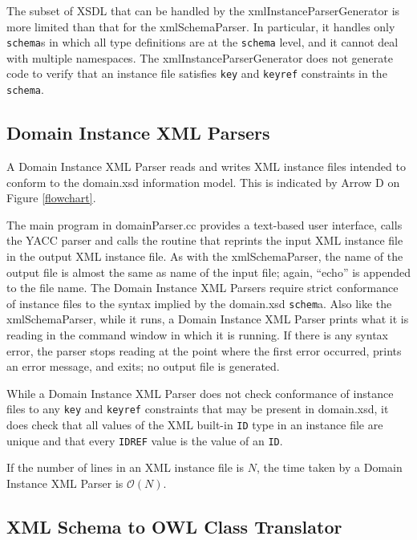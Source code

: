 \documentclass[preprint,12pt]{elsarticle}
\begin{document}
The subset of XSDL that can be handled by the xmlInstanceParserGenerator is
more limited than that for the xmlSchemaParser. In particular, it handles
only {\tt schema}s in which all type definitions are at the {\tt schema}
level, and it cannot deal with multiple namespaces. The
xmlInstanceParserGenerator does not generate code to verify that an
instance file satisfies {\tt key} and {\tt keyref} constraints in the {\tt
  schema}.

\subsection{Domain Instance XML Parsers}
\label{instanceXMLParser}

A Domain Instance XML Parser reads and writes XML instance files intended
to conform to the domain.xsd information model. This is indicated by Arrow
D on Figure \ref{flowchart}.

The main program in domainParser.cc provides a text-based user interface,
calls the YACC parser and calls the routine that reprints the input XML
instance file in the output XML instance file. As with the xmlSchemaParser,
the name of the output file is almost the same as name of the input file;
again, ``echo'' is appended to the file name. The Domain Instance XML
Parsers require strict conformance of instance files to the syntax implied
by the domain.xsd {\tt schem}a. Also like the xmlSchemaParser, while it
runs, a Domain Instance XML Parser prints what it is reading in the command
window in which it is running. If there is any syntax error, the parser
stops reading at the point where the first error occurred, prints an error
message, and exits; no output file is generated.

While a Domain Instance XML Parser does not check conformance of instance
files to any {\tt key} and {\tt keyref} constraints that may be present in
domain.xsd, it does check that all values of the XML built-in {\tt ID} type
in an instance file are unique and that every {\tt IDREF} value is the
value of an {\tt ID}.

If the number of lines in an XML instance file is ${N}$, the time taken by
a Domain Instance XML Parser is $\mathcal{O}{(N)}$.

\subsection{XML Schema to OWL Class Translator}
\label{schemaToOWL}
\end{document}
